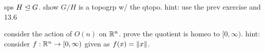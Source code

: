 \begin{exr}[source=Primary Source Material]
    sps $H \trianglelefteq G$. show $G/H$ is a topogrp w/ the qtopo. hint: use the prev
    exercise and 13.6
\end{exr}

\begin{exr}[source=Primary Source Material]
    consider the action of $O(n)$ on $\mathbb{R}^{n}$. prove the quotient is homeo to
    $[0,\infty)$. hint: consider $f:\mathbb{R}^{n}\rightarrow[0,\infty)$ given as
    $f(x)=\norm{x}$.
\end{exr}

